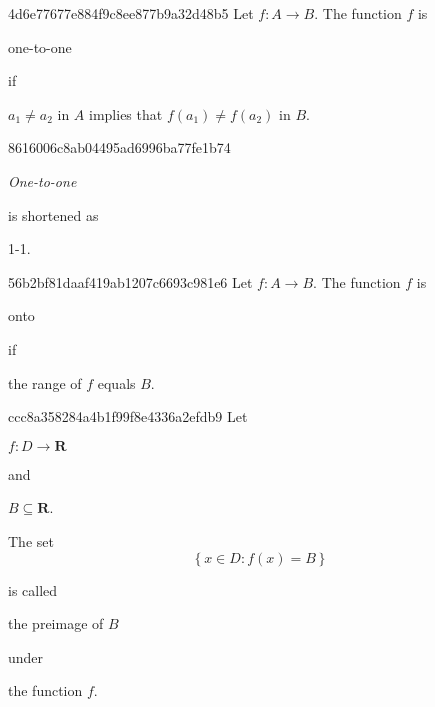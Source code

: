 \begin{note}{4d6e77677e884f9c8ee877b9a32d48b5}
    Let \({ f : A \to B }\). The function \({ f }\) is \begin{icloze}{2}one-to-one\end{icloze} if
    \begin{icloze}{1}
        \begin{center}
            \({ a_1 \neq a_2 }\) in \({ A }\) implies that \({ f(a_1) \neq f(a_2) }\) in \({ B }\).
        \end{center}
    \end{icloze}
\end{note}

\begin{note}{8616006c8ab04495ad6996ba77fe1b74}
    \begin{icloze}{2}\textit{One-to-one}\end{icloze} is shortened as \begin{icloze}{1}1-1.\end{icloze}
\end{note}

\begin{note}{56b2bf81daaf419ab1207c6693c981e6}
    Let \({ f : A \to B }\). The function \({ f }\) is \begin{icloze}{2}onto\end{icloze} if
    \begin{icloze}{1}
        \begin{center}
            the range of \({ f }\) equals \({ B }\).
        \end{center}
    \end{icloze}
\end{note}

\begin{note}{ccc8a358284a4b1f99f8e4336a2efdb9}
    Let \begin{icloze}{4}\({ f : D \to \mathbf{R} }\)\end{icloze} and \begin{icloze}{3}\({ B \subseteq \mathbf{R} }\).\end{icloze}
    \begin{icloze}{2}
        The set
        \[
            \left\{ x \in D : f(x) = B \right\}
        \]
    \end{icloze}
    is called \begin{icloze}{1}the preimage of \({ B }\)\end{icloze} \begin{icloze}{5}under\end{icloze} the function \({ f }\).
\end{note}

